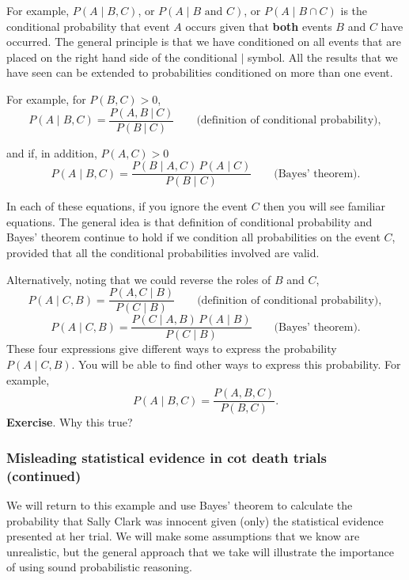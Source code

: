 \documentclass[
  british,
]{book}
\begin{document}
For example, \(P(A \mid B , C)\), or \(P(A \mid B \mbox{ and } C)\), or \(P(A \mid B \cap C)\) is the conditional probability that event \(A\) occurs given that \textbf{both} events \(B\) and \(C\) have occurred. The general principle is that we have conditioned on all events that are placed on the right hand side of the conditional \(\mid\) symbol. All the results that we have seen can be extended to probabilities conditioned on more than one event.

For example, for \(P(B, C)>0\),
\[ P(A \mid B, C) = \frac{P(A , B~|~C)}{P(B~|~C)} \qquad \mbox{(definition of conditional probability)}, \]

and if, in addition, \(P(A, C)>0\)
\[ P(A \mid B, C) = \frac{P(B \mid A, C)\,P(A \mid C)}{P(B \mid C)} \qquad \mbox{(Bayes' theorem)}. \]

In each of these equations, if you ignore the event \(C\) then you will see familiar equations. The general idea is that definition of conditional probability and Bayes' theorem continue to hold if we condition all probabilities on the event \(C\), provided that all the conditional probabilities involved are valid.

Alternatively, noting that we could reverse the roles of \(B\) and \(C\),
\[ P(A \mid C, B) = \frac{P(A , C \mid B)}{P(C \mid B)} \qquad \mbox{(definition of conditional probability)}, \]
\[ P(A \mid C, B) = \frac{P(C \mid A, B)\,P(A \mid B)}{P(C \mid B)} \qquad \mbox{(Bayes' theorem)}. \]
These four expressions give different ways to express the probability \(P(A \mid C, B)\). You will be able to find other ways to express this probability. For example,\\
\[ P(A \mid B,C) = \frac{P(A, B, C)}{P(B, C)}. \]
\textbf{Exercise}. Why this true?

\hypertarget{misleading-statistical-evidence-in-cot-death-trials-continued}{%
\subsubsection*{Misleading statistical evidence in cot death trials (continued)}\label{misleading-statistical-evidence-in-cot-death-trials-continued}}

We will return to this example and use Bayes' theorem to calculate the probability that Sally Clark was innocent given (only) the statistical evidence presented at her trial. We will make some assumptions that we know are unrealistic, but the general approach that we take will illustrate the importance of using sound probabilistic reasoning.
\end{document}
